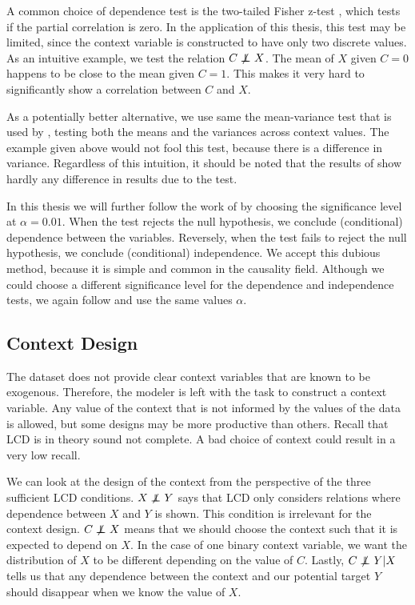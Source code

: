 A common choice of dependence test is the two-tailed Fisher z-test \citep{fisher1924distribution}, which tests if the partial correlation is zero. In the application of this thesis, this test may be limited, since the context variable is constructed to have only two discrete values. As an intuitive example, we test the relation $C\operatorname*{{\,\not\mkern-1mu\perp\mkern-12mu\perp\,}} X$. The mean of $X$ given $C=0$ happens to be close to the mean given $C=1$. This makes it very hard to significantly show a correlation between $C$ and $X$. 

As a potentially better alternative, we use same the mean-variance test that is used by \citet{versteeg2019boosting}, testing both the means and the variances across context values. The example given above would not fool this test, because there is a difference in variance. Regardless of this intuition, it should be noted that the results of \citet{versteeg2019boosting} show hardly any difference in results due to the test.

In this thesis we will further follow the work of \citet{versteeg2019boosting} by choosing the significance level at $\alpha=0.01$. When the test rejects the null hypothesis, we conclude (conditional) dependence between the variables. Reversely, when the test fails to reject the null hypothesis, we conclude (conditional) independence. We accept this dubious method, because it is simple and common in the causality field. Although we could choose a different significance level for the dependence and independence tests, we again follow \citet{versteeg2019boosting} and use the same values $\alpha$.


\subsection{Context Design}

The \citet{kemmeren2014large} dataset does not provide clear context variables that are known to be exogenous. Therefore, the modeler is left with the task to construct a context variable. Any value of the context that is not informed by the values of the data is allowed, but some designs may be more productive than others. Recall that LCD is in theory sound not complete. A bad choice of context could result in a very low recall. 

We can look at the design of the context from the perspective of the three sufficient LCD conditions. $X\operatorname*{{\,\not\mkern-1mu\perp\mkern-12mu\perp\,}} Y$ says that LCD only considers relations where dependence between $X$ and $Y$ is shown. This condition is irrelevant for the context design. $C\operatorname*{{\,\not\mkern-1mu\perp\mkern-12mu\perp\,}} X$ means that we should choose the context such that it is expected to depend on $X$. In the case of one binary context variable, we want the distribution of $X$ to be different depending on the value of $C$. Lastly, $C\operatorname*{{\,\not\mkern-1mu\perp\mkern-12mu\perp\,}} Y|X$ tells us that any dependence between the context and our potential target $Y$ should disappear when we know the value of $X$. 

